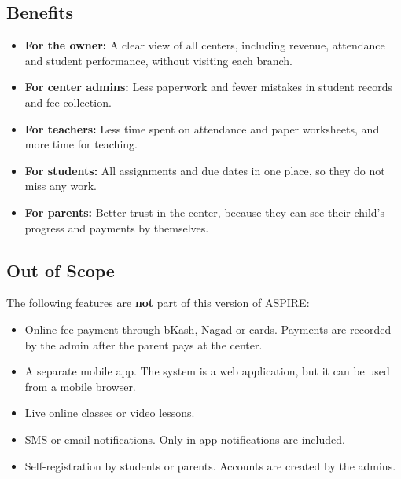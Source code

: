 \subsection{Benefits}
\begin{itemize}
  \item \textbf{For the owner:} A clear view of all centers, including revenue,
        attendance and student performance, without visiting each branch.
  \item \textbf{For center admins:} Less paperwork and fewer mistakes in student
        records and fee collection.
  \item \textbf{For teachers:} Less time spent on attendance and paper
        worksheets, and more time for teaching.
  \item \textbf{For students:} All assignments and due dates in one place, so
        they do not miss any work.
  \item \textbf{For parents:} Better trust in the center, because they can see
        their child's progress and payments by themselves.
\end{itemize}

\subsection{Out of Scope}
The following features are \textbf{not} part of this version of ASPIRE:
\begin{itemize}
  \item Online fee payment through bKash, Nagad or cards. Payments are recorded
        by the admin after the parent pays at the center.
  \item A separate mobile app. The system is a web application, but it can be
        used from a mobile browser.
  \item Live online classes or video lessons.
  \item SMS or email notifications. Only in-app notifications are included.
  \item Self-registration by students or parents. Accounts are created by the admins.
\end{itemize}

